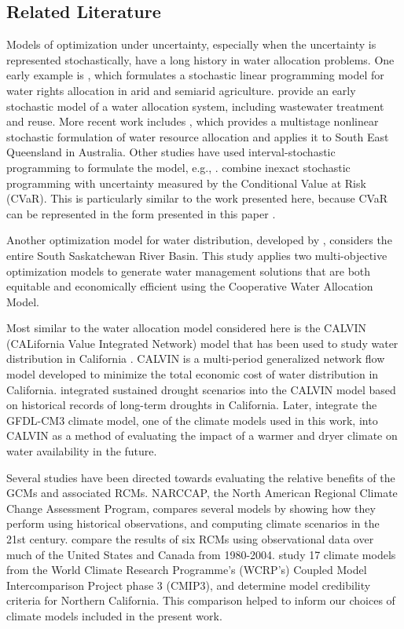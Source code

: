 \documentclass[opre,nonblindrev]{informs3} %
\begin{document}
\subsection{Related Literature}

Models of optimization under uncertainty, especially when the uncertainty is represented stochastically, have a long history in water allocation problems.
One early example is \citep{hall1970optimal}, which formulates a stochastic linear programming model for water rights allocation in arid and semiarid agriculture.
\cite{bishop1975optimization} provide an early stochastic model of a water allocation system, including wastewater treatment and reuse.
More recent work includes \citep{higgins2008stochastic}, which provides a multistage nonlinear stochastic formulation of water resource allocation and applies it to South East Queensland in Australia.
Other studies have used interval-stochastic programming to formulate the model, e.g., \citep{li2009multistage}.
\cite{shao2011conditional} combine inexact stochastic programming with uncertainty measured by the Conditional Value at Risk (CVaR).
This is particularly similar to the work presented here, because CVaR can be represented in the form presented in this paper \citep{love2013phi}.

Another optimization model for water distribution, developed by \cite{wang2008basin}, considers the entire South Saskatchewan River Basin.
This study applies two multi-objective optimization models to generate water management solutions that are both equitable and economically efficient using the Cooperative Water Allocation Model.

Most similar to the water allocation model considered here is the CALVIN (CALifornia Value Integrated Network) model that has been used to study water distribution in California \citep{draper_etal_03,jenkins2004optimization}.
CALVIN is a multi-period generalized network flow model developed to minimize the total economic cost of water distribution in California.
\cite{harou2010economic} integrated sustained drought scenarios into the CALVIN model based on historical records of long-term droughts in California.
Later, \cite{connell2011adapting} integrate the GFDL-CM3 climate model, one of the climate models used in this work, into CALVIN as a method of evaluating the impact of a warmer and dryer climate on water availability in the future.

Several studies have been directed towards evaluating the relative benefits of the GCMs and associated RCMs.
NARCCAP, the North American Regional Climate Change Assessment Program, compares several models by showing how they perform using historical observations, and computing climate scenarios in the 21st century.
\cite{mearns2012north} compare the results of six RCMs using observational data over much of the United States and Canada from 1980-2004.
\cite{brekke2008significance} study 17 climate models from the World Climate Research Programme's (WCRP's) Coupled Model Intercomparison Project
phase 3 (CMIP3), and determine model credibility criteria for Northern California.
This comparison helped to inform our choices of climate models included in the present work.
\end{document}
